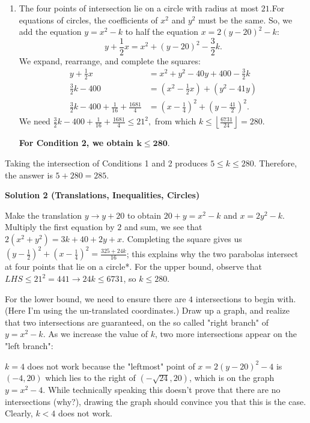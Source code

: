 \begin{enumerate}
\begin{enumerate}
  
        \item The four points of intersection lie on a circle with radius at most $21.$For equations of circles, the coefficients of $x^2$ and $y^2$ must be the same. So, we add the equation $y=x^2-k$ to half the equation $x=2(y-20)^2-k:$ 
 \[y+\frac12x=x^2+(y-20)^2-\frac32k.\]We expand, rearrange, and complete the squares:
 \begin{align*} y+\frac12x&=x^2+y^2-40y+400-\frac32k \\ \frac32k-400&=\left(x^2-\frac12x\right)+\left(y^2-41y\right) \\ \frac32k-400+\frac{1}{16}+\frac{1681}{4}&=\left(x-\frac14\right)^2+\left(y-\frac{41}{2}\right)^2. \end{align*}
We need $\frac32k-400+\frac{1}{16}+\frac{1681}{4}\leq21^2,$ from which $k\leq\left\lfloor\frac{6731}{24}\right\rfloor=280.$

 \textbf{For Condition 2, we obtain $\boldsymbol{k\leq280.}$}

 
            \end{enumerate}
            Taking the intersection of Conditions 1 and 2 produces $5\leq k\leq280.$ Therefore, the answer is $5+280=\boxed{285}.$




\textbf{Solution 2 (Translations, Inequalities, Circles)}

Make the translation $y \rightarrow y+20$ to obtain $20+y=x^2-k$ and $x=2y^2-k$. Multiply the first equation by $2$ and sum, we see that $2(x^2+y^2)=3k+40+2y+x$. Completing the square gives us $\left(y- \frac{1}{2}\right)^2+\left(x - \frac{1}{4}\right)^2 = \frac{325+24k}{16}$; this explains why the two parabolas intersect at four points that lie on a circle*. For the upper bound, observe that $LHS \leq 21^2=441 \rightarrow 24k \leq 6731$, so $k \leq 280$. 

 For the lower bound, we need to ensure there are $4$ intersections to begin with. (Here I'm using the un-translated coordinates.) Draw up a graph, and realize that two intersections are guaranteed, on the so called "right branch" of $y=x^2-k$. As we increase the value of $k$, two more intersections appear on the "left branch":

 $k=4$ does not work because the "leftmost" point of $x=2(y-20)^2-4$ is $(-4,20)$ which lies to the right of $\left(-\sqrt{24}, 20\right)$, which is on the graph $y=x^2-4$. While technically speaking this doesn't prove that there are no intersections (why?), drawing the graph should convince you that this is the case. Clearly, $k<4$ does not work.


\end{enumerate}
